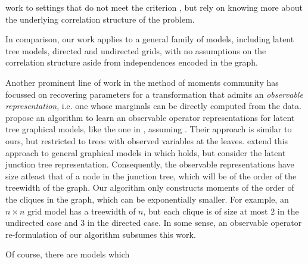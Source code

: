 work to settings that do not meet the
  criterion , but rely on knowing more about
  the underlying correlation structure of the problem.

In comparison, our work applies to a general family of models, including
  latent tree models, directed and undirected grids, with no assumptions
  on the correlation structure aside from independences encoded in the
  graph. 

Another prominent line of work in the method of moments community has
  focussed on recovering parameters for a transformation that admits an {\em observable
  representation}, i.e. one whose marginals can be directly computed from the data.
\citet{song2011spectral} propose an algorithm to learn an observable
  operator representations for latent tree graphical models, like the
  one in , assuming . 
Their approach is similar to ours, but restricted to trees with observed
  variables at the leaves.
\citet{parikh12spectral} extend this approach to general graphical
  models in which  holds, but consider the latent
  junction tree representation. 
Consequently, the observable representations have size atleast that of
  a node in the junction tree, which will be of the order of the treewidth
  of the graph. 
Our algorithm only constructs moments of the order of the cliques in the
  graph, which can be exponentially smaller. 
For example, an $n\times n$ grid model has a treewidth of $n$, but each
  clique is of size at most $2$ in the undirected case and $3$ in the
  directed case.
In some sense, an observable operator re-formulation of our algorithm
  subsumes this work.

Of course, there are models which 
\cite{kruskal77three}

